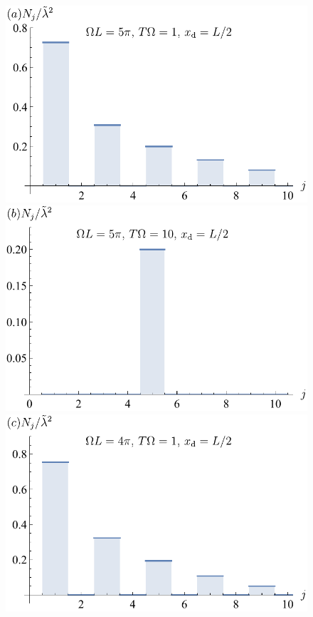 \documentclass[11pt,prd,onecolumn,superscriptaddress,nofootinbib,floatfix,amsmath,amssymb]{revtex4-2}
\begin{document}
    \begin{figure}[tp]
        \includegraphics[scale=0.5]{Fig7a.pdf}
        \includegraphics[scale=0.5]{Fig7b.pdf}
        \includegraphics[scale=0.5]{Fig7c.pdf}

\end{figure}
\end{document}
